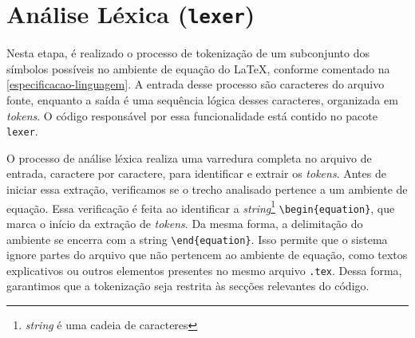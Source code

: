 
\section{Análise Léxica (\texttt{lexer})} \label{section-lexer}


Nesta etapa, é realizado o processo de tokenização de um subconjunto dos símbolos possíveis no ambiente de equação do \LaTeX{}, conforme comentado na \autoref{especificacao-linguagem}. A entrada desse processo são caracteres do arquivo fonte, enquanto a saída é uma sequência lógica desses caracteres, organizada em \textit{tokens}. O código responsável por essa funcionalidade  está contido no pacote \texttt{lexer}.

O processo de análise léxica realiza uma varredura completa no arquivo de entrada, caractere por caractere, para identificar e extrair os \textit{tokens}. Antes de iniciar essa extração, verificamos se o trecho analisado pertence a um ambiente de equação. Essa verificação é feita ao identificar a \textit{string}\footnote{\textit{string} é uma cadeia de caracteres} \verb|\begin{equation}|, que marca o início da extração de \textit{tokens}. Da mesma forma, a delimitação do ambiente se encerra com a string \verb|\end{equation}|. Isso permite que o sistema ignore partes do arquivo que não pertencem ao ambiente de equação, como textos explicativos ou outros elementos presentes no mesmo arquivo \texttt{.tex}. Dessa forma, garantimos que a tokenização seja restrita às secções relevantes do código.

    
%

